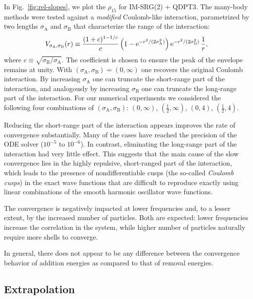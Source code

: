 In Fig.\ \ref{fig:rel-slopes}, we plot the $\rho_{15}$ for IM-SRG(2) + QDPT3.  The many-body methods were tested against a \emph{modified} Coulomb-like interaction, parametrized by two lengths $\sigma_{\mathrm{A}}$ and $\sigma_{\mathrm{B}}$ that characterize the range of the interaction:
\begin{align}
  V_{\sigma_{\mathrm{A}}, \sigma_{\mathrm{B}}}(r) \equiv \frac{(1 + c)^{1 - 1/c}}{c} \left(1 - \operatorname{e}^{-r^2 / (2 \sigma_{\mathrm{A}}^2)}\right) \operatorname{e}^{-r^2 / (2 \sigma_{\mathrm{B}}^2)} \frac{1}{r},
\end{align}
where $c \equiv \sqrt{\sigma_{\mathrm{B}} / \sigma_{\mathrm{A}}}$.  The coefficient is chosen to ensure the peak of the envelope remains at unity.  With $(\sigma_{\mathrm{A}}, \sigma_{\mathrm{B}}) = (0, \infty)$ one recovers the original Coulomb interaction.  By increasing $\sigma_{\mathrm{A}}$ one can truncate the short-range part of the interaction, and analogously by increasing $\sigma_{\mathrm{B}}$ one can truncate the long-range part of the interaction.  For our numerical experiments we considered the following four combinations of $(\sigma_{\mathrm{A}}, \sigma_{\mathrm{B}})$: $(0, \infty)$, $(\frac{1}{2}, \infty)$, $(0, 4)$, $(\frac{1}{2}, 4)$.

Reducing the short-range part of the interaction appears improves the rate of convergence substantially.  Many of the cases have reached the precision of the ODE solver ($10^{-5}$ to $10^{-6}$).  In contrast, eliminating the long-range part of the interaction had very little effect.  This suggests that the main cause of the slow convergence lies in the highly repulsive, short-ranged part of the interaction, which leads to the presence of nondifferentiable cusps (the so-called \textit{Coulomb cusps}) in the exact wave functions that are difficult to reproduce exactly using linear combinations of the smooth harmonic oscillator wave functions.

The convergence is negatively impacted at lower frequencies and, to a lesser extent, by the increased number of particles.  Both are expected: lower frequencies increase the correlation in the system, while higher number of particles naturally require more shells to converge.

In general, there does not appear to be any difference between the convergence behavior of addition energies as compared to that of removal energies.

\subsection{Extrapolation}
\label{subsec:extrapolation}

